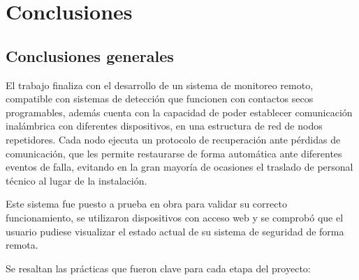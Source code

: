 
\chapter{Conclusiones} %

\label{Chapter5} %




\section{Conclusiones generales }

El trabajo finaliza con el desarrollo de un sistema de monitoreo remoto, compatible con sistemas de detección que funcionen con contactos secos programables, además cuenta con la capacidad de poder establecer comunicación inalámbrica con diferentes dispositivos, en una estructura de red de nodos repetidores. Cada nodo ejecuta un protocolo de recuperación ante pérdidas de comunicación, que les permite restaurarse de forma automática ante diferentes eventos de falla, evitando en la gran mayoría de ocasiones el traslado de personal técnico al lugar de la instalación. 

Este sistema fue puesto a prueba en obra para validar su correcto funcionamiento, se utilizaron dispositivos con acceso web y se comprobó que el usuario pudiese visualizar el estado actual  de su sistema de seguridad de forma remota. 

Se resaltan las prácticas que fueron clave para cada etapa del proyecto:

